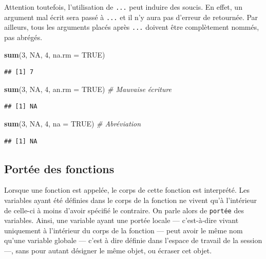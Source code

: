 \documentclass[
  11pt,
]{book}
\newenvironment{Shaded}{\begin{snugshade}}{\end{snugshade}}
\newcommand{\CommentTok}[1]{\textcolor[rgb]{0.56,0.35,0.01}{\textit{#1}}}
\newcommand{\DataTypeTok}[1]{\textcolor[rgb]{0.13,0.29,0.53}{#1}}
\newcommand{\DecValTok}[1]{\textcolor[rgb]{0.00,0.00,0.81}{#1}}
\newcommand{\KeywordTok}[1]{\textcolor[rgb]{0.13,0.29,0.53}{\textbf{#1}}}
\newcommand{\NormalTok}[1]{#1}
\newcommand{\OtherTok}[1]{\textcolor[rgb]{0.56,0.35,0.01}{#1}}
\numberwithin{equation}{section}
\numberwithin{countremarque}{section}
\begin{document}
Attention toutefois, l'utilisation de \texttt{...} peut induire des soucis. En effet, un argument mal écrit sera passé à \texttt{...} et il n'y aura pas d'erreur de retournée. Par ailleurs, tous les arguments placés après \texttt{...} doivent être complètement nommés, pas abrégés.

\begin{Shaded}
\begin{Highlighting}[]
\KeywordTok{sum}\NormalTok{(}\DecValTok{3}\NormalTok{, }\OtherTok{NA}\NormalTok{, }\DecValTok{4}\NormalTok{, }\DataTypeTok{na.rm =} \OtherTok{TRUE}\NormalTok{)}
\end{Highlighting}
\end{Shaded}

\begin{lstlisting}
## [1] 7
\end{lstlisting}

\begin{Shaded}
\begin{Highlighting}[]
\KeywordTok{sum}\NormalTok{(}\DecValTok{3}\NormalTok{, }\OtherTok{NA}\NormalTok{, }\DecValTok{4}\NormalTok{, }\DataTypeTok{an.rm =} \OtherTok{TRUE}\NormalTok{) }\CommentTok{\# Mauvaise écriture}
\end{Highlighting}
\end{Shaded}

\begin{lstlisting}
## [1] NA
\end{lstlisting}

\begin{Shaded}
\begin{Highlighting}[]
\KeywordTok{sum}\NormalTok{(}\DecValTok{3}\NormalTok{, }\OtherTok{NA}\NormalTok{, }\DecValTok{4}\NormalTok{, }\DataTypeTok{na =} \OtherTok{TRUE}\NormalTok{)  }\CommentTok{\# Abréviation}
\end{Highlighting}
\end{Shaded}

\begin{lstlisting}
## [1] NA
\end{lstlisting}

\hypertarget{fonctions_structure_environnement}{%
\subsection{Portée des fonctions}\label{fonctions_structure_environnement}}

Lorsque une fonction est appelée, le corps de cette fonction est interprété. Les variables ayant été définies dans le corps de la fonction ne vivent qu'à l'intérieur de celle-ci à moins d'avoir spécifié le contraire. On parle alors de \texttt{portée} des variables. Ainsi, une variable ayant une portée locale --- c'est-à-dire vivant uniquement à l'intérieur du corps de la fonction --- peut avoir le même nom qu'une variable globale --- c'est à dire définie dans l'espace de travail de la session ---, sans pour autant désigner le même objet, ou écraser cet objet.
\end{document}
